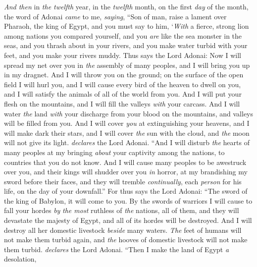 \begin{biblechapter} %
 \textit{And then} in \textit{the twelfth} year, in the \textit{twelfth} month, on the first \textit{day} of the month, the word of Adonai \textit{came} to me, \textit{saying},
\verse “Son of man, raise a lament over Pharaoh, the king of Egypt, and you must say to him, ‘\textit{With} a fierce, strong lion among nations you compared yourself, 
and you \textit{are} like the sea monster in the seas, 
and you thrash about in your rivers, 
and you make water turbid with your feet, 
and you make your rivers muddy.
\verse Thus says the Lord Adonai:
\verse Now I will spread my net over you 
in \textit{the} assembly of many peoples, 
and I will bring you up in my dragnet.
\verse And I will throw you on the ground; 
on the surface of the open field I will hurl you, 
and I will cause every bird of the heaven to dwell on you, 
and I will satisfy the animals of all of the world from you.
\verse And I will put your flesh on the mountains, 
and I will fill the valleys \textit{with} your carcass.
\verse And I will water \textit{the} land \textit{with} your discharge from your blood 
on the mountains, 
and valleys will be filled from you.
\verse And I will cover \textit{you} at extinguishing your heavens, 
and I will make dark their stars, 
and I will cover \textit{the} sun with the cloud, 
and \textit{the} moon will not give its light. \textit{declares} the Lord Adonai.
\verse “And I will disturb \textit{the} hearts of many peoples 
at my bringing \textit{about} your captivity among the nations, 
to countries that you do not know.
\verse And I will cause many peoples to be awestruck over you, 
and their kings will shudder over you \textit{in} horror, 
at my brandishing my sword before their faces, 
and they will tremble \textit{continually}, 
each \textit{person} for his life, 
on the day of your downfall.”
\verse For thus says the Lord Adonai:
\verse “The sword of the king of Babylon, 
it will come to you.
\verse By the swords of warriors I will cause to fall your hordes 
\textit{by} \textit{the most} ruthless of \textit{the} nations, all of them, 
and they will devastate the majesty of Egypt, 
and all of its hordes will be destroyed.
\verse And I will destroy all her domestic livestock 
\textit{beside} many waters. 
\textit{The} feet of humans will not make them turbid again, 
and \textit{the} hooves of domestic livestock will not make them turbid. \textit{declares} the Lord Adonai.
\verse “Then I make the land of Egypt \textit{a} desolation, 

\end{biblechapter}
